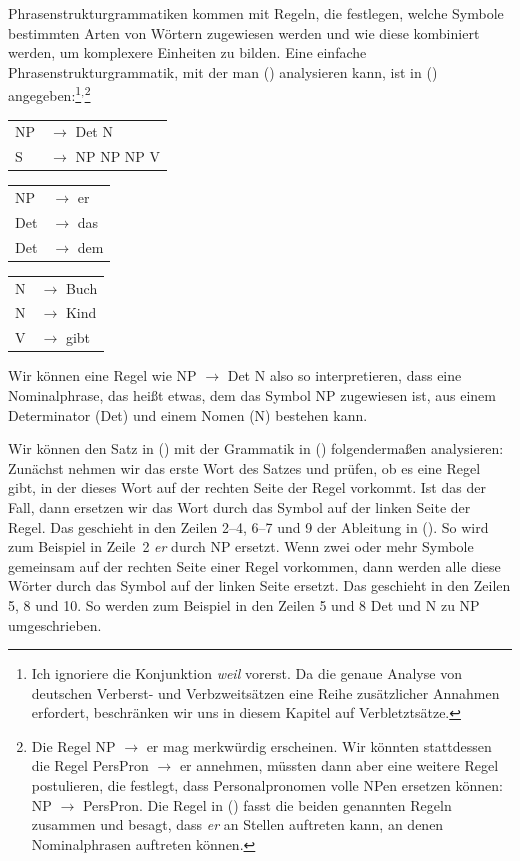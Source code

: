 Phrasenstrukturgrammatiken kommen mit Regeln, die festlegen, welche Symbole bestimmten Arten von Wörtern zugewiesen werden und wie diese kombiniert werden, um komplexere
Einheiten zu bilden. Eine einfache Phrasenstrukturgrammatik, mit der man () analysieren kann, ist in () angegeben:\footnote{%
	Ich ignoriere die Konjunktion \emph{weil} vorerst. Da die genaue Analyse von
        deutschen Verberst- und Verbzweitsätzen eine Reihe zusätzlicher Annahmen erfordert, beschränken wir uns in diesem Kapitel auf Verbletztsätze.
}$^,$\footnote{\label{fn-np-pron-ps-rule}%
	Die Regel NP $\to$ er mag merkwürdig erscheinen. Wir könnten stattdessen die Regel PersPron $\to$ er annehmen, müssten dann aber eine weitere Regel postulieren,
	die festlegt, dass Personalpronomen volle NPen ersetzen können: NP $\to$ PersPron. Die Regel in () fasst die beiden genannten Regeln zusammen und besagt,
	dass \emph{er} an Stellen auftreten kann, an denen Nominalphrasen auftreten können.
}
\ea
\label{bsp-grammatik-psg}
\begin{tabular}[t]{@{}l@{ }l}
{NP} & {$\to$ Det N}\\          
{S}  & {$\to$ NP NP NP V}
\end{tabular}\hspace{2cm}%
\begin{tabular}[t]{@{}l@{ }l}
{NP} & {$\to$ er}\\
{Det}  & {$\to$ das}\\
{Det}  & {$\to$ dem}\\
\end{tabular}\hspace{8mm}
\begin{tabular}[t]{@{}l@{ }l}
{N} & {$\to$ Buch}\\
{N} & {$\to$ Kind}\\
{V} & {$\to$ gibt}\\
\end{tabular}
\z
Wir können eine Regel wie NP $\to$\is{$\to$} Det N also so interpretieren, dass eine Nominalphrase, das heißt etwas, dem das Symbol NP zugewiesen ist, aus
einem Determinator (Det) und einem Nomen (N) bestehen kann.

Wir können den Satz in () mit der Grammatik in () folgendermaßen analysieren:
Zunächst nehmen wir das erste Wort des Satzes und prüfen, ob es eine Regel gibt, in der dieses Wort auf der rechten
Seite der Regel vorkommt. Ist das der Fall, dann ersetzen wir das Wort durch das Symbol auf der linken Seite der Regel. Das geschieht
in den Zeilen 2--4, 6--7 und 9 der Ableitung in (). So wird
zum Beispiel in Zeile~2 \emph{er} durch NP ersetzt.
Wenn zwei oder mehr Symbole gemeinsam auf der rechten Seite einer Regel vorkommen, dann werden alle
diese Wörter durch das Symbol auf der linken Seite ersetzt. Das geschieht in den Zeilen 5, 8 und 10. So
werden zum Beispiel in den Zeilen 5 und 8 Det und N zu NP umgeschrieben.

